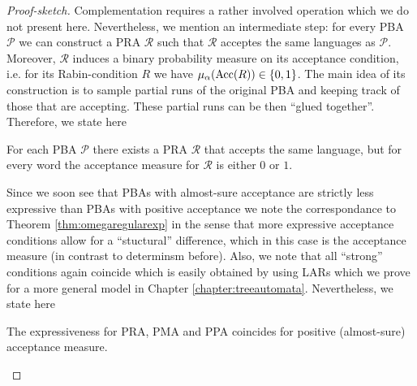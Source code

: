 \begin{proof}[Proof-sketch]
  Complementation requires a rather involved operation which we do not present 
  here. Nevertheless, we mention an intermediate step: for every \ac{PBA}
  $\mathcal{P}$ we can construct a \ac{PRA} $\mathcal{R}$ such that
  $\mathcal{R}$ acceptes the same languages as $\mathcal{P}$. Moreover,
  $\mathcal{R}$ induces a binary probability measure on its acceptance
  condition, i.e. for its Rabin-condition $R$ we have
  $\mu_{\alpha}(\operatorname{Acc}(R))\in\left\{0,1\right\}$. The main idea of its construction is to
  sample partial runs of the original \ac{PBA} and keeping track of those that
  are accepting. These partial runs can be then \enquote{glued together}.
  Therefore, we state here
  \begin{theorem}
    \cite[Theorem 4.3.2]{Groesser}
    For each \ac{PBA} $\mathcal{P}$ there exists a \ac{PRA} $\mathcal{R}$ that 
    accepts the same language, but for every word the acceptance measure for
    $\mathcal{R}$ is either $0$ or $1$.
    \label{thm:pbatopra}
  \end{theorem}
  Since we soon see that \acp{PBA} with almost-sure acceptance are strictly
  less expressive than \acp{PBA} with positive acceptance we note the 
  correspondance to Theorem \ref{thm:omegaregularexp} in the
  sense that more expressive acceptance conditions allow for a 
  \enquote{stuctural} difference, which in this case is the acceptance measure
  (in contrast to determinsm before). Also, we note that all \enquote{strong}
  conditions again coincide which is easily obtained by using \acp{LAR} which
  we prove for a more general model in Chapter \ref{chapter:treeautomata}.
  Nevertheless, we state here
  \begin{theorem}
    The expressiveness for \ac{PRA}, \ac{PMA} and \ac{PPA} coincides for
    positive (almost-sure) acceptance measure.
    \label{thm:probautoequiv}
  \end{theorem}
\end{proof}

